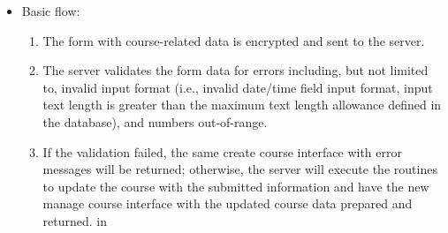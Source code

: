 \begin{enumerate}
\begin{itemize}
    \item Basic flow:
        \begin{enumerate}
            \item The form with course-related data is encrypted and sent to
                the server.
            \item The server validates the form data for errors including,
                but not limited to,
                invalid input format
                (i.e., invalid date/time field input format,
                input text length is greater than the maximum text length
                allowance defined in the database),
                and numbers out-of-range.
            \item If the validation failed, the same create course interface
                with error messages will be returned; otherwise, the server will
                execute the routines to update the course with the submitted 
                information and have the new manage course interface with the
                updated course data prepared and returned.
             in
        \end{enumerate}
\end{itemize}


\end{enumerate}
